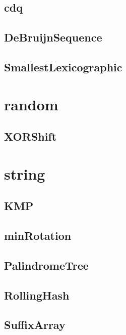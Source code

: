 \documentclass[a4paper,10pt,twocolumn,oneside]{article}
\begin{document}
    \subsection{cdq}
    

    \subsection{DeBruijnSequence}
    

    \subsection{SmallestLexicographic}
    

\section{random}
    \subsection{XORShift}
    

\section{string}
    \subsection{KMP}
    

    \subsection{minRotation}
    

    \subsection{PalindromeTree}
    

    \subsection{RollingHash}
    

    \subsection{SuffixArray}
    
\end{document}
